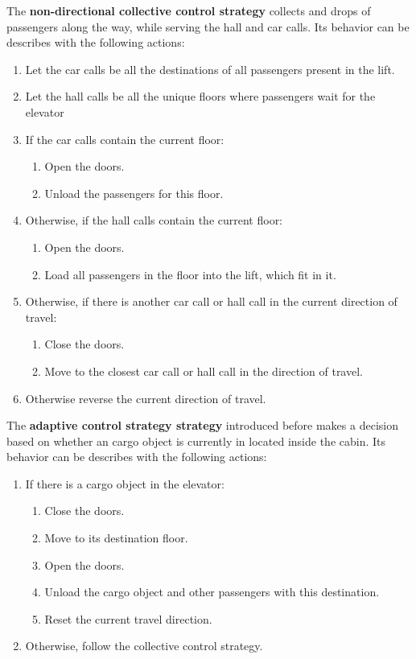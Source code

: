 The \textbf{non-directional collective control strategy} collects and drops of passengers along the way, while serving the hall and car calls.
Its behavior can be describes with the following actions:
\begin{enumerate}[noitemsep]
    \item Let the car calls be all the destinations of all passengers present in the lift.
    \item Let the hall calls be all the unique floors where passengers wait for the elevator
    \item If the car calls contain the current floor:
    \begin{enumerate}[noitemsep]
        \item Open the doors.
        \item Unload the passengers for this floor.
    \end{enumerate}
    \item Otherwise, if the hall calls contain the current floor:
    \begin{enumerate}[noitemsep]
        \item Open the doors.
        \item Load all passengers in the floor into the lift, which fit in it.
    \end{enumerate}
    \item Otherwise, if there is another car call or hall call in the current direction of travel:
    \begin{enumerate}[noitemsep]
        \item Close the doors.
        \item Move to the closest car call or hall call in the direction of travel.
    \end{enumerate}
    \item Otherwise reverse the current direction of travel.
\end{enumerate}

The \textbf{adaptive control strategy strategy} introduced before makes a decision based on whether an cargo object is currently in located inside the cabin.
Its behavior can be describes with the following actions:
\begin{enumerate}[noitemsep]
    \item If there is a cargo object in the elevator:
    \begin{enumerate}[noitemsep]
        \item Close the doors.
        \item Move to its destination floor.
        \item Open the doors.
        \item Unload the cargo object and other passengers with this destination.
        \item Reset the current travel direction.
    \end{enumerate}
    \item Otherwise, follow the collective control strategy.
\end{enumerate}

